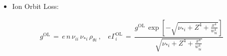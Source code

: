 \documentclass[a4paper,8pt]{article}
\providecommand{\tightlist}{%
  \setlength{\itemsep}{0pt}\setlength{\parskip}{0pt}}
\begin{document}
\normalsize

\begin{itemize}
\tightlist
\item
  Ion Orbit Loss: \small

  \begin{align}
  g^\text{OL} \,=\, e \,n\, \nu_{ii} \, \nu_{*i} \, \rho_{\theta i}~,~~~~
  e\Gamma_i^\text{OL} \,=\, \dfrac{g^\text{OL}\,
      \exp\left[-\sqrt{\nu_{*i} + Z^4 + \frac{x^4}{w_{bi}^4}}\right]}
      {\sqrt{\nu_{*i} + Z^4 + \frac{x^4}{w_{bi}^4}}}
  \end{align}

  \normalsize
\end{itemize}
\end{document}
